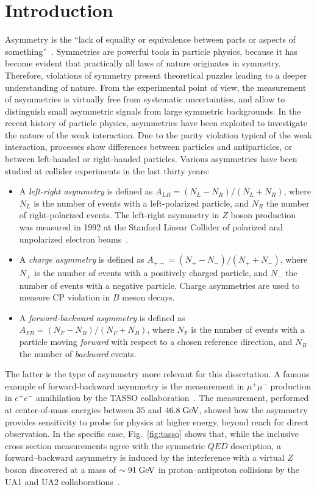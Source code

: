 \chapter{Introduction}
\label{sec:introduction}

Asymmetry is the ``lack of equality or equivalence between parts or
aspects of something''~\cite{oxforddict}.
Symmetries are powerful tools in particle physics, because it has
become evident that practically all laws of nature originates in
symmetry. Therefore, violations of symmetry present theoretical
puzzles leading to a deeper understanding of nature. From the
experimental point of view, the measurement of asymmetries is
virtually free from systematic uncertainties, and allow to distinguish
small asymmetric signals from large symmetric backgrounds.
In the recent history of particle physics, asymmetries have been
exploited to investigate the nature of the weak interaction. 
Due to the parity violation typical of the weak
interaction, processes show differences between particles and
antiparticles, or between left-handed or right-handed particles.
Various asymmetries have been studied at collider experiments in the
last thirty years:

\begin{itemize}
\item A {\it left-right asymmetry} is defined as $A_{LR}=(N_L -
  N_R)/(N_L +N_R)$, where $N_L$ is the number of events with a
  left-polarized particle, and $N_R$ the number of right-polarized
  events. The left-right asymmetry in $Z$ boson production was
  measured in 1992 at the Stanford Linear Collider of polarized and
  unpolarized electron beams~\cite{Elia:1993ka}.
\item A {\it charge asymmetry}  is defined as $A_{+-}=(N_+ -
  N_-)/(N_+ +N_-)$, where $N_+$ is the number of events with a
  positively charged particle, and $N_-$ the number of events with a
  negative particle. Charge asymmetries are used to measure CP
  violation in $B$ meson decays.
\item A {\it forward-backward asymmetry} is defined as $A_{FB}=(N_F -
  N_B)/(N_F +N_B)$, where $N_F$ is the number of events with a
  particle moving {\it forward} with respect to a chosen reference
  direction, and $N_B$ the number of {\it backward} events.
\end{itemize}

The latter is the type of asymmetry more relevant for this
dissertation. A famous example of forward-backward asymmetry is the
measurement in $\mu^+\mu^-$ production in $e^+e^-$ annihilation by the
TASSO collaboration~\cite{Braunschweig:1988fy}. The measurement,
performed at center-of-mass energies between $35$ and $46.8\; \mathrm{GeV}{}$,
showed how the asymmetry provides sensitivity to probe for physics at
higher energy, beyond reach for direct observation. In the 
specific case, Fig.~\ref{fig:tasso} shows that, while the inclusive
cross section measurements agree with the symmetric $QED$ description,
a forward--backward asymmetry is induced by the interference with a virtual
$Z$ boson discovered at a mass of $\sim 91\; \mathrm{GeV}{}$ in
proton--antiproton collisions by the UA1 and UA2
collaborations~\cite{Arnison:1983rp,Banner:1983jy}.

